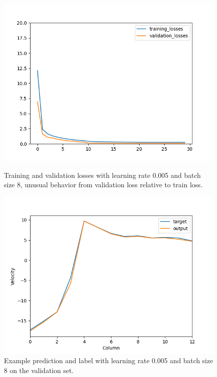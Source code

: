 \documentclass[10pt,conference]{IEEEtran}
\begin{document}
\begin{figure}[h]
  \centering
  \begin{minipage}[h]{0.2\textwidth}
    \includegraphics[width=\textwidth]{images/validation.png}
    \caption{Training and validation losses with learning rate 0.005 and batch size 8, unusual behavior from validation loss relative to train loss.}
    \label{figure:validation}
  \end{minipage}
  \hfill
  \begin{minipage}[h]{0.2\textwidth}
    \includegraphics[width=\textwidth]{images/predictions.png}
    \caption{Example prediction and label with learning rate 0.005 and batch size 8 on the validation set.}
    \label{figure:predictions}
  \end{minipage}
\end{figure}
\end{document}
